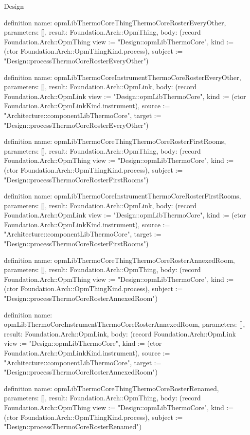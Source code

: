 \begin{lexlean}{Design}
\begin{semanticmodule}
definition{
  name: opmLibThermoCoreThingThermoCoreRosterEveryOther,
  parameters: [],
  result: Foundation.Arch::OpmThing,
  body: (record Foundation.Arch::OpmThing {view := "Design::opmLibThermoCore", kind := (ctor Foundation.Arch::OpmThingKind.process), subject := "Design::processThermoCoreRosterEveryOther"})
}

definition{
  name: opmLibThermoCoreInstrumentThermoCoreRosterEveryOther,
  parameters: [],
  result: Foundation.Arch::OpmLink,
  body: (record Foundation.Arch::OpmLink {view := "Design::opmLibThermoCore", kind := (ctor Foundation.Arch::OpmLinkKind.instrument), source := "Architecture::componentLibThermoCore", target := "Design::processThermoCoreRosterEveryOther"})
}

definition{
  name: opmLibThermoCoreThingThermoCoreRosterFirstRooms,
  parameters: [],
  result: Foundation.Arch::OpmThing,
  body: (record Foundation.Arch::OpmThing {view := "Design::opmLibThermoCore", kind := (ctor Foundation.Arch::OpmThingKind.process), subject := "Design::processThermoCoreRosterFirstRooms"})
}

definition{
  name: opmLibThermoCoreInstrumentThermoCoreRosterFirstRooms,
  parameters: [],
  result: Foundation.Arch::OpmLink,
  body: (record Foundation.Arch::OpmLink {view := "Design::opmLibThermoCore", kind := (ctor Foundation.Arch::OpmLinkKind.instrument), source := "Architecture::componentLibThermoCore", target := "Design::processThermoCoreRosterFirstRooms"})
}

definition{
  name: opmLibThermoCoreThingThermoCoreRosterAnnexedRoom,
  parameters: [],
  result: Foundation.Arch::OpmThing,
  body: (record Foundation.Arch::OpmThing {view := "Design::opmLibThermoCore", kind := (ctor Foundation.Arch::OpmThingKind.process), subject := "Design::processThermoCoreRosterAnnexedRoom"})
}

definition{
  name: opmLibThermoCoreInstrumentThermoCoreRosterAnnexedRoom,
  parameters: [],
  result: Foundation.Arch::OpmLink,
  body: (record Foundation.Arch::OpmLink {view := "Design::opmLibThermoCore", kind := (ctor Foundation.Arch::OpmLinkKind.instrument), source := "Architecture::componentLibThermoCore", target := "Design::processThermoCoreRosterAnnexedRoom"})
}

definition{
  name: opmLibThermoCoreThingThermoCoreRosterRenamed,
  parameters: [],
  result: Foundation.Arch::OpmThing,
  body: (record Foundation.Arch::OpmThing {view := "Design::opmLibThermoCore", kind := (ctor Foundation.Arch::OpmThingKind.process), subject := "Design::processThermoCoreRosterRenamed"})
}


\end{semanticmodule}
\end{lexlean}

